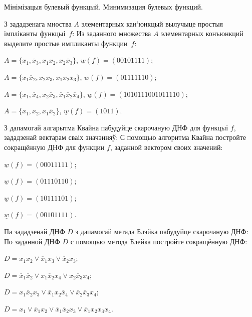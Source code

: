 \documentclass[12pt, a4paper]{article}
\begin{document}
\biLangHeader
{Мінімізацыя булевый функцый.}
{Минимизация булевых функций.}

\begin{problemList}

\problemItemWithCommonPart
{З зададзенага мноства $A$ элементарных кан'юнкцый вылучыце простыя імпліканты функцыі~$f$:}
{Из заданного множества $A$ элементарных конъюнкций выделите простые импликанты функции~$f$:}
{%
\begin{belarusianEnumerate}
    \item $A=\{x_1, \overline{x}_3, x_1x_2, x_2\overline{x}_3\}$, $\underline{w}(f)=(00101111)$;
    \item $A=\{x_1\overline{x}_2, x_2x_3, x_1x_2x_3\}$, $\underline{w}(f)=(01111110)$;
    \item $A=\{x_1, \overline{x}_4, x_2\overline{x}_3, \overline{x}_1\overline{x}_2\overline{x}_4\}$, $\underline{w}(f)=(1010111001011110)$;
    \item $A=\{x_1, x_2, x_1\overline{x}_2\}$, $\underline{w}(f)=(1011)$.
\end{belarusianEnumerate}
}

\smallskip

\problemItemWithCommonPart
{З дапамогай алгарытма Квайна пабудуйце скарочаную ДНФ для функцыі $f$,
зададзенай вектарам сваіх значэнняў:}
{С помощью алгоритма Квайна постройте сокращённую ДНФ для функции $f$, 
заданной вектором своих значений:}
{%
\begin{belarusianEnumerateTwocol}
    \item $\underline{w}(f)=(00011111)$;
    \item $\underline{w}(f)=(01110110)$;
    \item $\underline{w}(f)=(10111101)$;
    \item $\underline{w}(f)=(00101111)$.
\end{belarusianEnumerateTwocol}
}

\smallskip

\problemItemWithCommonPart
{Па зададзенай ДНФ $D$ з дапамогай метада Блэйка пабудуйце скарочаную ДНФ:}
{По заданной ДНФ $D$ с помощью метода Блейка постройте сокращённую ДНФ:}
{%
\begin{belarusianEnumerateTwocol}
    \item $D=x_1x_2\vee \overline{x}_1x_3\vee \overline{x}_2x_3$;
    \item $D=\overline{x}_1\overline{x}_2\vee x_1\overline{x}_2x_4\vee x_2\overline{x}_3x_4$;
    \item $D=x_1\overline{x}_2x_3\vee \overline{x}_1x_2\overline{x}_4\vee \overline{x}_2\overline{x}_3x_4$;
    \item $D=x_1\vee\overline{x}_1x_2\vee \overline{x}_1\overline{x}_2x_3\vee \overline{x}_1x_2x_3x_4$.
\end{belarusianEnumerateTwocol}
}


\end{problemList}
\end{document}

